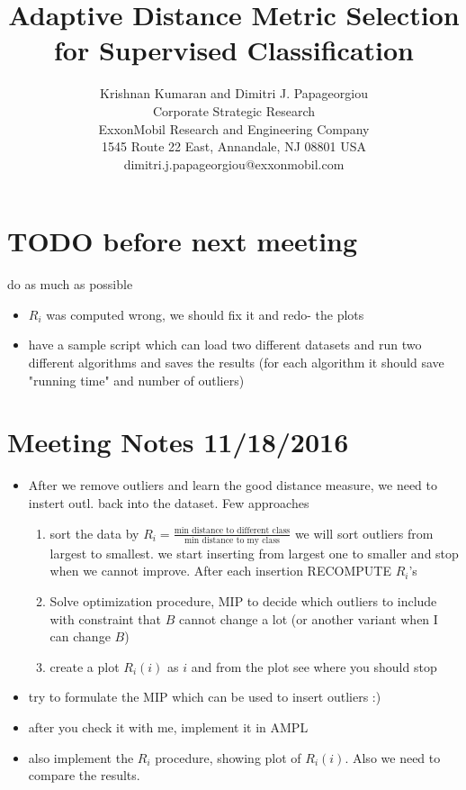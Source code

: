\documentclass[]{article}
\title{Adaptive Distance Metric Selection for Supervised Classification}
\author{Krishnan Kumaran and Dimitri J. Papageorgiou \\
{\small Corporate Strategic Research}\\
{\small ExxonMobil Research and Engineering Company}\\
{\small 1545 Route 22 East, Annandale, NJ 08801 USA}\\
{\small dimitri.j.papageorgiou@exxonmobil.com} \\
}
\begin{document}
\maketitle



\section{TODO before next meeting}
do as much as possible

\begin{itemize}
\item $R_i$ was computed wrong, we should fix it and redo- the plots

\item have a sample script which can load two different datasets 
and run two different algorithms and saves the results (for each algorithm it should save "running time" and number of outliers)



\end{itemize}



\section{Meeting Notes 11/18/2016}


\begin{itemize}
\item After we remove outliers and learn the good distance measure, we need to instert outl. back into the dataset. Few approaches
\begin{enumerate}
\item sort the data by $R_i = \frac{ \mbox{min distance to different class} }{ \mbox{min distance to my class} }$
we will sort outliers from largest to smallest.
we start inserting from largest one to smaller and stop when we cannot improve.
After each insertion RECOMPUTE $R_i$'s
\item Solve optimization procedure, MIP to decide which outliers to include with constraint that $B$ cannot change a lot (or another variant when I can change $B$)
\item create a plot $R_i(i)$ as $i$ and from the plot see where you should stop
\end{enumerate}
\end{itemize}

\begin{itemize}
\item try to formulate the MIP which can be used to insert outliers :)
\item after you check it with me, implement it in AMPL


\item also implement the $R_i$ procedure, 
showing plot of $R_i(i)$.
Also we need to compare the results.

\end{itemize}
\end{document}
